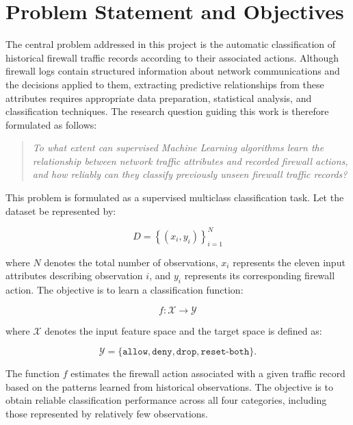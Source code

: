 \section{Problem Statement and Objectives}

The central problem addressed in this project is the automatic classification of historical firewall traffic records according to their associated actions. Although firewall logs contain structured information about network communications and the decisions applied to them, extracting predictive relationships from these attributes requires appropriate data preparation, statistical analysis, and classification techniques. The research question guiding this work is therefore formulated as follows:

\begin{quote}
\textit{To what extent can supervised Machine Learning algorithms learn the relationship between network traffic attributes and recorded firewall actions, and how reliably can they classify previously unseen firewall traffic records?}
\end{quote}

This problem is formulated as a supervised multiclass classification task. Let the dataset be represented by:

\begin{equation}
    D = \left\{(x_i,y_i)\right\}_{i=1}^{N}
    \label{eq:classification-dataset}
\end{equation}

where $N$ denotes the total number of observations, $x_i$ represents the eleven input attributes describing observation $i$, and $y_i$ represents its corresponding firewall action. The objective is to learn a classification function:

\begin{equation}
    f:\mathcal{X}\rightarrow\mathcal{Y}
    \label{eq:classification-function}
\end{equation}

where $\mathcal{X}$ denotes the input feature space and the target space is defined as:

\begin{equation}
    \mathcal{Y} =
    \{\texttt{allow},\texttt{deny},
    \texttt{drop},\texttt{reset-both}\}.
    \label{eq:action-classes}
\end{equation}

The function $f$ estimates the firewall action associated with a given traffic record based on the patterns learned from historical observations. The objective is to obtain reliable classification performance across all four categories, including those represented by relatively few observations.

